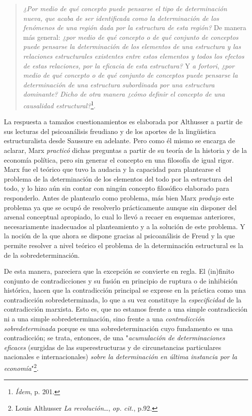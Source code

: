\documentclass{book}
\begin{document}
\begin{quote}
\emph{¿Por medio de qué concepto puede pensarse el tipo de determinación
nueva, que acaba de ser identificada como la determinación de los
fenómenos de una región dada por la estructura de esta región?} De
manera más general: \emph{¿por medio de qué concepto o de qué conjunto
de conceptos puede pensarse la determinación de los elementos de una
estructura y las relaciones estructurales existentes entre estos
elementos y todos los efectos de estas relaciones, por la eficacia de
esta estructura?} Y \emph{a fortori}, \emph{¿por medio de qué concepto o
de qué conjunto de conceptos puede pensarse la determinación de una
estructura subordinada por una estructura dominante? Dicho de otra
manera ¿cómo definir el concepto de una causalidad
estructural?}\footnote{\emph{Ídem}, p. 201.}.
\end{quote}

La respuesta a tamaños cuestionamientos es elaborada por Althusser a
partir de sus lecturas del psicoanálisis freudiano y de los aportes de
la lingüística estructuralista desde Saussure en adelante. Pero como él
mismo se encarga de aclarar, Marx \emph{practicó} dichas preguntas a
partir de su teoría de la historia y de la economía política, pero sin
generar el concepto en una filosofía de igual rigor. Marx fue el teórico
que tuvo la audacia y la capacidad para plantearse el problema de la
determinación de los elementos del todo por la estructura del todo, y lo
hizo aún sin contar con ningún concepto filosófico elaborado para
responderlo. Antes de plantearlo como problema, más bien Marx
\emph{produjo} este problema ya que se ocupó de resolverlo prácticamente
aunque sin disponer del arsenal conceptual apropiado, lo cual lo llevó a
recaer en esquemas anteriores, necesariamente inadecuados al
planteamiento y a la solución de este problema. Y la noción de la que
ahora se dispone gracias al psicoanálisis de Freud y la que permite
resolver a nivel teórico el problema de la determinación estructural es
la de la sobredeterminación.

De esta manera, pareciera que la excepción se convierte en regla. El
(in)finito conjunto de contradicciones y su fusión en principio de
ruptura o de inhibición histórica, hacen que la contradicción principal
se exprese en la práctica como una contradicción sobredeterminada, lo
que a su vez constituye la \emph{especificidad} de la contradicción
marxista. Esto es, que no estamos frente a una simple contradicción ni a
una simple sobredeterminación, sino frente a una \emph{contradicción
sobredeterminada} porque es una sobredeterminación cuyo fundamento es
una contradicción; se trata, entonces, de una "\emph{acumulación de
determinaciones eficaces} (surgidas de las superestructuras y de
circunstancias particulares nacionales e internacionales) \emph{sobre la
determinación en última instancia por la economía}"\footnote{Louis
  Althusser \emph{La revolución}\ldots, \emph{op. cit.}, p.92.}.
\end{document}
